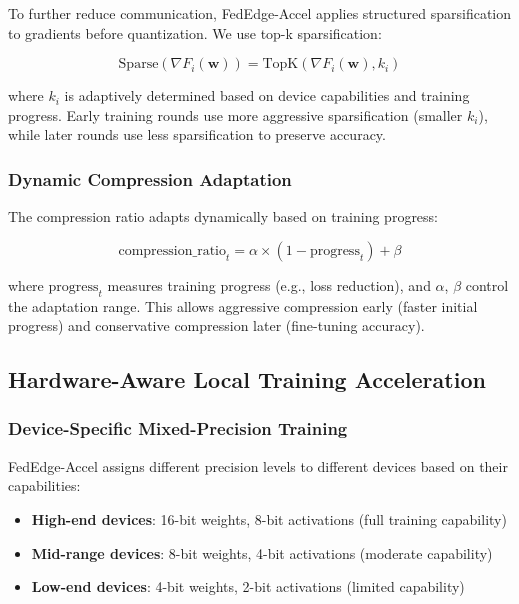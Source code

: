 \documentclass[journal]{IEEEtran}
\begin{document}
To further reduce communication, FedEdge-Accel applies structured sparsification to gradients before quantization. We use top-k sparsification:

\begin{equation}
\text{Sparse}(\nabla F_i(\mathbf{w})) = \text{TopK}(\nabla F_i(\mathbf{w}), k_i)
\label{eq:sparsification}
\end{equation}

where $k_i$ is adaptively determined based on device capabilities and training progress. Early training rounds use more aggressive sparsification (smaller $k_i$), while later rounds use less sparsification to preserve accuracy.

\subsubsection{Dynamic Compression Adaptation}

The compression ratio adapts dynamically based on training progress:

\begin{equation}
\text{compression\_ratio}_t = \alpha \times (1 - \text{progress}_t) + \beta
\label{eq:adaptive_compression}
\end{equation}

where $\text{progress}_t$ measures training progress (e.g., loss reduction), and $\alpha$, $\beta$ control the adaptation range. This allows aggressive compression early (faster initial progress) and conservative compression later (fine-tuning accuracy).

\subsection{Hardware-Aware Local Training Acceleration}

\subsubsection{Device-Specific Mixed-Precision Training}

FedEdge-Accel assigns different precision levels to different devices based on their capabilities:

\begin{itemize}
    \item \textbf{High-end devices}: 16-bit weights, 8-bit activations (full training capability)
    \item \textbf{Mid-range devices}: 8-bit weights, 4-bit activations (moderate capability)
    \item \textbf{Low-end devices}: 4-bit weights, 2-bit activations (limited capability)
\end{itemize}
\end{document}
